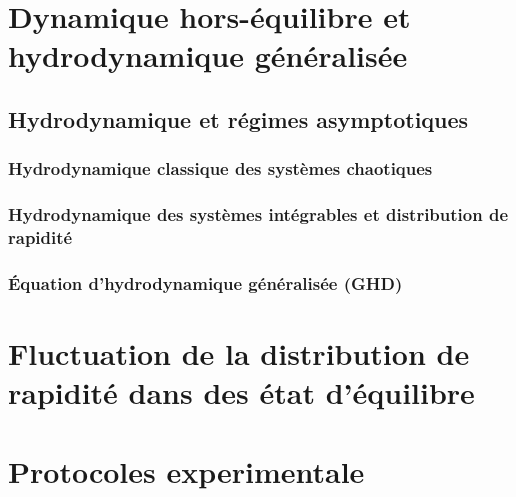 \chapter{Dynamique hors-équilibre et hydrodynamique généralisée}
\minitoc
\section{Hydrodynamique et régimes asymptotiques}

\subsection{Hydrodynamique classique des systèmes chaotiques}
\subsection{Hydrodynamique des systèmes intégrables et distribution de rapidité}
\subsection{Équation d’hydrodynamique généralisée (GHD)}

\chapter{Fluctuation de la distribution de rapidité dans des état d'équilibre} 



\chapter{Protocoles experimentale}
\minitoc
